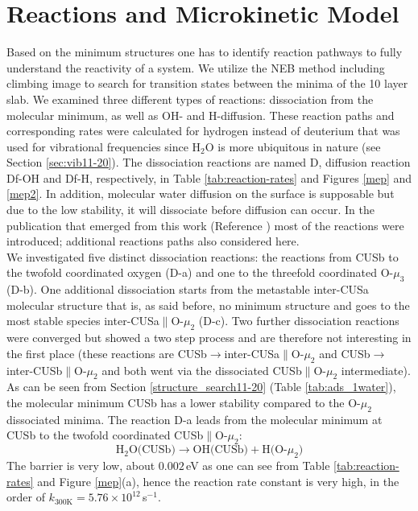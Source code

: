 \documentclass[11pt,DIV=13,BCOR=5mm,a4paper,headinclude]{scrbook}
\begin{document}
\section{Reactions and Microkinetic Model}\label{reactions}
Based on the minimum structures one has to identify reaction pathways to fully understand the reactivity of a system.
 We utilize the NEB method including climbing image to search for transition states between the minima of the 10 layer slab.
We examined three different types of reactions: dissociation from the molecular minimum, as well as OH- and H-diffusion.
These reaction paths and corresponding rates were calculated for hydrogen instead of deuterium that was used for vibrational frequencies since H$_2$O is more ubiquitous in nature (see Section \ref{sec:vib11-20}).
The dissociation reactions are named D, diffusion reaction Df-OH and Df-H, respectively, in Table \ref{tab:reaction-rates} and Figures \ref{mep} and \ref{mep2}.
In addition, molecular water diffusion on the surface is supposable but due to the low stability, it will dissociate before diffusion can occur.
In the publication that emerged from this work (Reference \cite{Heiden11-20_2018}) most of the reactions were introduced; additional reactions paths also considered here.
\\
We investigated five distinct dissociation reactions: the reactions from CUSb to the twofold coordinated oxygen (D-a) and one to the threefold coordinated O-$\mu_3$ (D-b).
One additional dissociation starts from the metastable inter-CUSa molecular structure that is, as said before, no minimum structure and goes to the most stable species inter-CUSa$\parallel$O-$\mu_2$ (D-c).
Two further dissociation reactions were converged but showed a two step process and are therefore not interesting in the first place (these reactions are CUSb$\rightarrow$inter-CUSa$\parallel$O-$\mu_2$ and CUSb$\rightarrow$inter-CUSb$\parallel$O-$\mu_2$ and both went via the dissociated CUSb$\parallel$O-$\mu_2$ intermediate).
\\
As can be seen from Section \ref{structure_search11-20} (Table \ref{tab:ads_1water}), the molecular minimum CUSb has a lower stability compared to the O-$\mu_2$ dissociated minima.
The reaction D-a leads from the molecular minimum at CUSb to the twofold coordinated CUSb$\parallel$O-$\mu_2$:
 \begin{equation}
 \text{H$_2$O(CUSb)} \rightarrow \text{OH(CUSb)} + \text{H(O-$\mu_2$)} \tag{D-a}
      \label{dissa}
\end{equation}
The barrier is very low, about $0.002\,$eV as one can see from Table \ref{tab:reaction-rates} and Figure \ref{mep}(a), hence the reaction rate constant is very high, in the order of $k_{\text{300K}}=5.76\times 10^{12}\,$s$^{-1}$.
\end{document}
